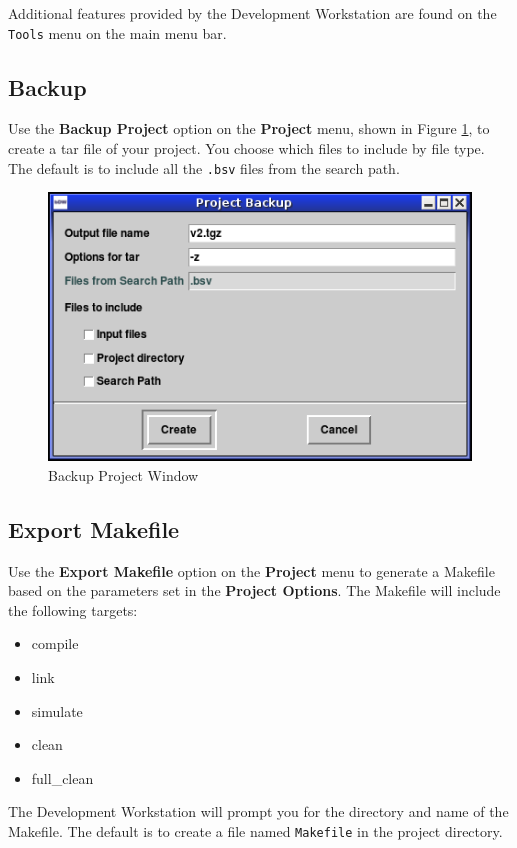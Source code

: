\documentclass{article}
\newcommand{\te}[1]{\texttt{#1}}
\begin{document}
Additional features provided by the Development Workstation are found
on the \te{Tools} menu on the main menu bar.


\subsection{Backup}
Use the {\bf Backup Project} option on the {\bf Project} menu, shown
in Figure \ref{fig-backup},   to create
a tar file of your project.  You
 choose which files to include by file type.  The default is to
include all the \te{.bsv} files from the search path.

\begin{figure}[ht]
\begin{center}
\includegraphics[height = 2 in]{figures/backup}
\caption{Backup Project Window}
\label{fig-backup}
\end{center}
\end{figure}


\subsection{Export Makefile}

Use the {\bf Export Makefile} option on the {\bf Project} menu to
generate a Makefile based on the parameters set in the {\bf Project
Options}.  The Makefile will include the following
targets:
\begin{itemize}
\item compile
\item link
\item simulate
\item clean
\item full\_clean
\end{itemize}

The Development Workstation will prompt you for the directory and name
of the Makefile.  The default is to create a file named \te{Makefile}
in the project directory.
\end{document}
